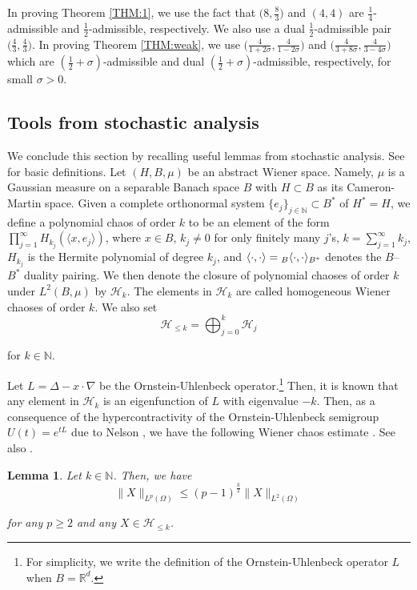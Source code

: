 \documentclass[%
11pt,  reqno]{amsart}
\newtheorem{lemma}[theorem]{Lemma}
\newcommand{\1}{\hspace{0.2mm}\text{I}\hspace{0.2mm}}
\newcommand{\noi}{\noindent}
\newcommand{\R}{\mathbb{R}}
\newcommand{\Dl}{\Delta}
\newcommand{\s}{\sigma}
\renewcommand{\O}{\Omega}
\newcommand{\jb}[1]
{\langle #1 \rangle}
\newcommand{\N}{\mathbb{N}}
\renewcommand{\H}{\mathcal{H}}
\numberwithin{equation}{section}
\numberwithin{theorem}{section}
\begin{document}
In proving Theorem \ref{THM:1}, we use the fact that 
$\big(8, \frac{8}{3}\big)$
and $(4, 4)$ are $\frac 14$-admissible
and 
  $\frac 12$-admissible, respectively.
We also use
a dual $\frac12$-admissible pair  $\big(\frac 43, \frac 43\big)$.
In proving Theorem \ref{THM:weak}, 
we use 
$\big(\frac{4}{1+2\s}, \frac{4}{1-2\s}\big)$
and $\big(\frac{4}{3+8\s}, \frac{4}{3-4\s}\big)$
which are
$(\frac 12 + \s) $-admissible 
and dual $(\frac 12 + \s) $-admissible, respectively,
for small $\s > 0$.







\subsection{Tools from stochastic analysis}

We conclude this section by recalling useful lemmas
from stochastic analysis.
See \cite{Bog, Shige} for basic definitions.
Let $(H, B, \mu)$ be an abstract Wiener space.
Namely, $\mu$ is a Gaussian measure on a separable Banach space $B$
with $H \subset B$ as its Cameron-Martin space.
Given  a complete orthonormal system $\{e_j \}_{ j \in \N} \subset B^*$ of $H^* = H$, 
we  define a polynomial chaos of order
$k$ to be an element of the form $\prod_{j = 1}^\infty H_{k_j}(\jb{x, e_j})$, 
where $x \in B$, $k_j \ne 0$ for only finitely many $j$'s, $k= \sum_{j = 1}^\infty k_j$, 
$H_{k_j}$ is the Hermite polynomial of degree $k_j$, 
and $\jb{\cdot, \cdot} = \vphantom{|}_B \jb{\cdot, \cdot}_{B^*}$ denotes the $B$--$B^*$ duality pairing.
We then 
denote the closure  of 
polynomial chaoses of order $k$ 
under $L^2(B, \mu)$ by $\mathcal{H}_k$.
The elements in $\H_k$ 
are called homogeneous Wiener chaoses of order $k$.
We also set
\[ \H_{\leq k} = \bigoplus_{j = 0}^k \H_j\]

\noi
 for $k \in \N$.

Let $L = \Dl -x \cdot \nabla$ be 
 the Ornstein-Uhlenbeck operator.\footnote{For simplicity, 
 we write the definition of the Ornstein-Uhlenbeck operator $L$
 when $B = \R^d$.}
Then, 
it is known that 
any element in $\mathcal H_k$ 
is an eigenfunction of $L$ with eigenvalue $-k$.
Then, as a consequence
of the  hypercontractivity of the Ornstein-Uhlenbeck
semigroup $U(t) = e^{tL}$ due to Nelson \cite{Nelson2}, 
we have the following Wiener chaos estimate
\cite[Theorem~I.22]{Simon}.
See also \cite[Proposition~2.4]{TTz}.


\begin{lemma}\label{LEM:hyp}
Let $k \in \N$.
Then, we have
\begin{equation*}
\|X \|_{L^p(\O)} \leq (p-1)^\frac{k}{2} \|X\|_{L^2(\O)}
 \end{equation*}
 
 \noi
 for any $p \geq 2$
 and any $X \in \H_{\leq k}$.



\end{lemma}
\end{document}
